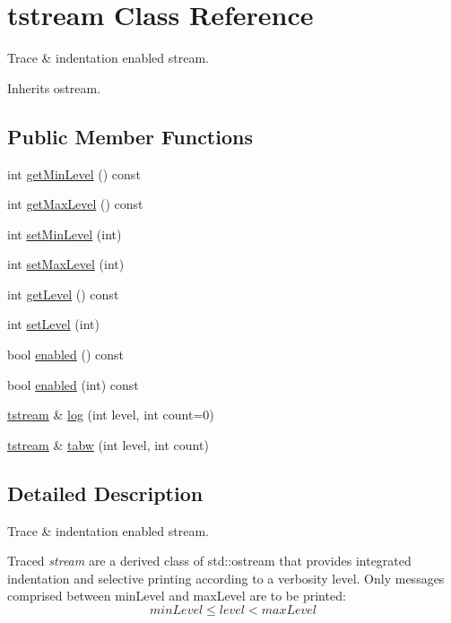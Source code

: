 \hypertarget{clasststream}{}\section{tstream Class Reference}
\label{clasststream}


Trace \& indentation enabled stream.  




Inherits ostream.

\subsection*{Public Member Functions}
\begin{DoxyCompactItemize}
\item 
int \hyperlink{clasststream_a86cfc3fc7bfa7d0064d27dea74d6888d}{get\+Min\+Level} () const
\item 
int \hyperlink{clasststream_abb7ecc2e0ddeab5442d52acb2ea5fd64}{get\+Max\+Level} () const
\item 
int \hyperlink{clasststream_a0dad8cbc8fc5611b788f55c75a20a88e}{set\+Min\+Level} (int)
\item 
int \hyperlink{clasststream_a75cb778234d7b49d9e89c73e6efcd132}{set\+Max\+Level} (int)
\item 
int \hyperlink{clasststream_a01c90e5cc80064cae20d3a4bc3320683}{get\+Level} () const
\item 
int \hyperlink{clasststream_a37fa7894d7ae83674ee7cb5a69a4c4a5}{set\+Level} (int)
\item 
bool \hyperlink{clasststream_a01303d5c2c5cd83d06985622ca50d77b}{enabled} () const
\item 
bool \hyperlink{clasststream_a3dab6aeefd316ad326a29cec3c2c574b}{enabled} (int) const
\item 
\hyperlink{clasststream}{tstream} \& \hyperlink{clasststream_a1fe9745dc492e891a6e765e34fa082c3}{log} (int level, int count=0)
\item 
\hyperlink{clasststream}{tstream} \& \hyperlink{clasststream_a5aa7a21d7b95f1bf40e68b5b13118fd0}{tabw} (int level, int count)
\end{DoxyCompactItemize}


\subsection{Detailed Description}
Trace \& indentation enabled stream. 

Traced {\itshape stream} are a derived class of std\+::ostream that provides integrated indentation and selective printing according to a verbosity level. Only messages comprised between {\ttfamily min\+Level} and {\ttfamily max\+Level} are to be printed\+: \[ minLevel \leq level < maxLevel \]


